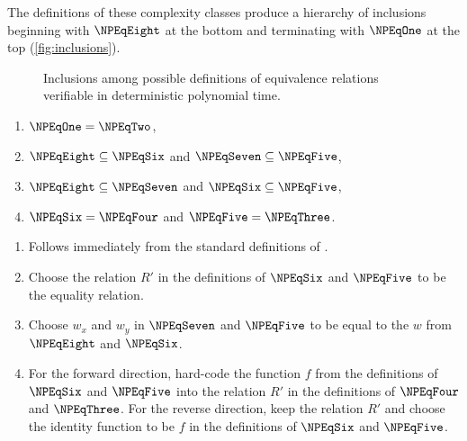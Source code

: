 The definitions of these complexity classes produce a hierarchy of inclusions beginning with $\NPEqEight$ at the bottom and terminating with $\NPEqOne$ at the top (\autoref{fig:inclusions}).
\begin{figure}
  \caption{\label{fig:inclusions}Inclusions among possible definitions of equivalence relations verifiable in deterministic polynomial time.}
  \begin{center}
  \end{center}
\end{figure}
\begin{theorem}\label{thm:definitions}\mbox{}
  \begin{enumerate}
  \item $\NPEqOne = \NPEqTwo$,
  \item $\NPEqEight \subseteq \NPEqSix$ and $\NPEqSeven \subseteq \NPEqFive$,
  \item $\NPEqEight \subseteq \NPEqSeven$ and $\NPEqSix \subseteq \NPEqFive$,
  \item $\NPEqSix = \NPEqFour$ and $\NPEqFive = \NPEqThree$.
  \end{enumerate}
\end{theorem}
\begin{sketch}\mbox{}
  \begin{enumerate}
  \item Follows immediately from the standard definitions of \NP.
  \item Choose the relation $R'$ in the definitions of $\NPEqSix$ and $\NPEqFive$ to be the equality relation.
  \item Choose $w_x$ and $w_y$ in $\NPEqSeven$ and $\NPEqFive$ to be equal to the $w$ from $\NPEqEight$ and $\NPEqSix$.
  \item
    For the forward direction, hard-code the function $f$ from the definitions of $\NPEqSix$ and $\NPEqFive$ into the relation $R'$ in the definitions of $\NPEqFour$ and $\NPEqThree$.
    For the reverse direction, keep the relation $R'$ and choose the identity function to be $f$ in the definitions of $\NPEqSix$ and $\NPEqFive$.
    \qedhere
  \end{enumerate}
\end{sketch}

